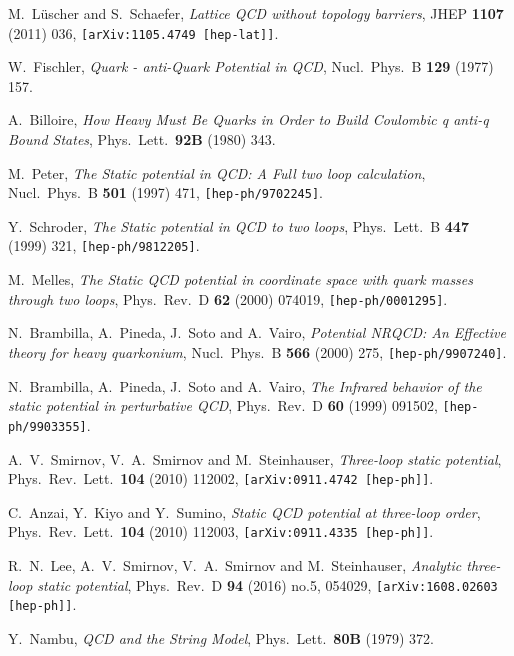 \documentclass{PoS}
\begin{document}
\begin{thebibliography}{99}
  M.~L{\"u}scher and S.~Schaefer,
  \emph{Lattice QCD without topology barriers},
  JHEP {\bf 1107} (2011) 036,
  {\tt [arXiv:1105.4749 [hep-lat]]}.

  W.~Fischler,
  \emph{Quark - anti-Quark Potential in QCD},
  Nucl.\ Phys.\ B {\bf 129} (1977) 157.

  A.~Billoire,
  \emph{How Heavy Must Be Quarks in Order to Build Coulombic q anti-q Bound States},
  Phys.\ Lett.\  {\bf 92B} (1980) 343.

  M.~Peter,
  \emph{The Static potential in QCD: A Full two loop calculation},
  Nucl.\ Phys.\ B {\bf 501} (1997) 471,
  {\tt [hep-ph/9702245]}.

  Y.~Schroder,
  \emph{The Static potential in QCD to two loops},
  Phys.\ Lett.\ B {\bf 447} (1999) 321,
  {\tt [hep-ph/9812205]}.

  M.~Melles,
  \emph{The Static QCD potential in coordinate space with quark masses through two loops},
  Phys.\ Rev.\ D {\bf 62} (2000) 074019,
  {\tt [hep-ph/0001295]}.

  N.~Brambilla, A.~Pineda, J.~Soto and A.~Vairo,
  \emph{Potential NRQCD: An Effective theory for heavy quarkonium},
  Nucl.\ Phys.\ B {\bf 566} (2000) 275,
  {\tt [hep-ph/9907240]}.

  N.~Brambilla, A.~Pineda, J.~Soto and A.~Vairo,
  \emph{The Infrared behavior of the static potential in perturbative QCD},
  Phys.\ Rev.\ D {\bf 60} (1999) 091502,
  {\tt [hep-ph/9903355]}.

  A.~V.~Smirnov, V.~A.~Smirnov and M.~Steinhauser,
  \emph{Three-loop static potential},
  Phys.\ Rev.\ Lett.\  {\bf 104} (2010) 112002,
  {\tt [arXiv:0911.4742 [hep-ph]]}.

  C.~Anzai, Y.~Kiyo and Y.~Sumino,
  \emph{Static QCD potential at three-loop order},
  Phys.\ Rev.\ Lett.\  {\bf 104} (2010) 112003,
  {\tt [arXiv:0911.4335 [hep-ph]]}.

  R.~N.~Lee, A.~V.~Smirnov, V.~A.~Smirnov and M.~Steinhauser,
  \emph{Analytic three-loop static potential},
  Phys.\ Rev.\ D {\bf 94} (2016) no.5,  054029,
  {\tt [arXiv:1608.02603 [hep-ph]]}.

  Y.~Nambu,
  \emph{QCD and the String Model},
  Phys.\ Lett.\  {\bf 80B} (1979) 372.


\end{thebibliography}
\end{document}
